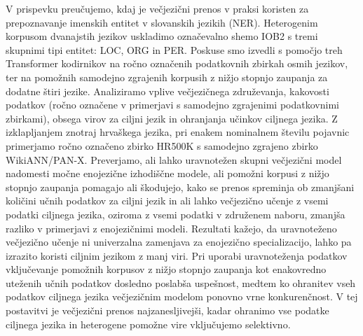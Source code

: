 \documentclass{article}
\begin{document}

\printbibliography

\newpage
{}
\begin{abstracteng}
V prispevku preučujemo, kdaj je večjezični prenos v praksi koristen za prepoznavanje imenskih entitet v slovanskih jezikih (NER).
Heterogenim korpusom dvanajstih jezikov uskladimo označevalno shemo IOB2 s tremi skupnimi tipi entitet: LOC, ORG in PER.
Poskuse smo izvedli s pomočjo treh Transformer kodirnikov na ročno označenih podatkovnih zbirkah osmih jezikov, ter na pomožnih samodejno zgrajenih korpusih z nižjo stopnjo zaupanja za dodatne štiri jezike.
Analiziramo vplive večjezičnega združevanja, kakovosti podatkov (ročno označene v primerjavi s samodejno zgrajenimi podatkovnimi zbirkami), obsega virov za ciljni jezik in ohranjanja učinkov ciljnega jezika.
Z izklapljanjem znotraj hrvaškega jezika, pri enakem nominalnem številu pojavnic primerjamo ročno označeno zbirko HR500K s samodejno zgrajeno zbirko WikiANN/PAN-X.
Preverjamo, ali lahko uravnotežen skupni večjezični model nadomesti močne enojezične izhodiščne modele, ali pomožni korpusi z nižjo stopnjo zaupanja pomagajo ali škodujejo, kako se prenos spreminja ob zmanjšani količini učnih podatkov za ciljni jezik in ali lahko večjezično učenje z vsemi podatki ciljnega jezika, oziroma z vsemi podatki v združenem naboru, zmanjša razliko v primerjavi z enojezičnimi modeli.
Rezultati kažejo, da uravnoteženo večjezično učenje ni univerzalna zamenjava za enojezično specializacijo, lahko pa izrazito koristi ciljnim jezikom z manj viri.
Pri uporabi uravnoteženja podatkov vključevanje pomožnih korpusov z nižjo stopnjo zaupanja kot enakovredno uteženih učnih podatkov dosledno poslabša uspešnost, medtem ko ohranitev vseh podatkov ciljnega jezika večjezičnim modelom ponovno vrne konkurenčnost.
V tej postavitvi je večjezični prenos najzanesljivejši, kadar ohranimo vse podatke ciljnega jezika in heterogene pomožne vire vključujemo selektivno.
\end{abstracteng}

\end{document}
